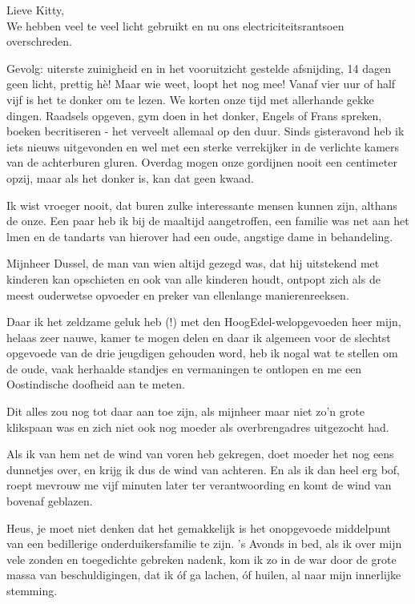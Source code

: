 \documentclass{book}
\begin{document}
Lieve Kitty,\\We hebben veel te veel licht gebruikt en nu ons
electriciteitsrantsoen overschreden.

Gevolg: uiterste zuinigheid en in het vooruitzicht gestelde afsnijding,
14 dagen geen licht, prettig hè! Maar wie weet, loopt het nog mee! Vanaf
vier uur of half vijf is het te donker om te lezen. We korten onze tijd
met allerhande gekke dingen. Raadsels opgeven, gym doen in het donker,
Engels of Frans spreken, boeken becritiseren - het verveelt allemaal op
den duur. Sinds gisteravond heb ik iets nieuws uitgevonden en wel met
een sterke verrekijker in de verlichte kamers van de achterburen gluren.
Overdag mogen onze gordijnen nooit een centimeter opzij, maar als het
donker is, kan dat geen kwaad.

Ik wist vroeger nooit, dat buren zulke interessante mensen kunnen zijn,
althans de onze. Een paar heb ik bij de maaltijd aangetroffen, een
familie was net aan het lmen en de tandarts van hierover had een oude,
angstige dame in behandeling.

Mijnheer Dussel, de man van wien altijd gezegd was, dat hij uitstekend
met kinderen kan opschieten en ook van alle kinderen houdt, ontpopt zich
als de meest ouderwetse opvoeder en preker van ellenlange
manierenreeksen.

Daar ik het zeldzame geluk heb (!) met den HoogEdel-welopgevoeden heer
mijn, helaas zeer nauwe, kamer te mogen delen en daar ik algemeen voor
de slechtst opgevoede van de drie jeugdigen gehouden word, heb ik nogal
wat te stellen om de oude, vaak herhaalde standjes en vermaningen te
ontlopen en me een Oostindische doofheid aan te meten.

Dit alles zou nog tot daar aan toe zijn, als mijnheer maar niet zo'n
grote klikspaan was en zich niet ook nog moeder als overbrengadres
uitgezocht had.

Als ik van hem net de wind van voren heb gekregen, doet moeder het nog
eens dunnetjes over, en krijg ik dus de wind van achteren. En als ik dan
heel erg bof, roept mevrouw me vijf minuten later ter verantwoording en
komt de wind van bovenaf geblazen.

Heus, je moet niet denken dat het gemakkelijk is het onopgevoede
middelpunt van een bedillerige onderduikersfamilie te zijn. 's Avonds in
bed, als ik over mijn vele zonden en toegedichte gebreken nadenk, kom ik
zo in de war door de grote massa van beschuldigingen, dat ik óf ga
lachen, óf huilen, al naar mijn innerlijke stemming.
\end{document}
